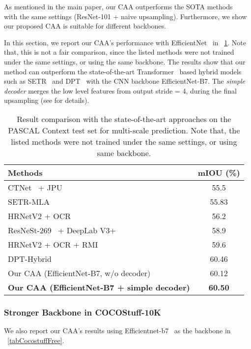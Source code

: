 \documentclass[letterpaper]{article} \usepackage{aaai22}  \usepackage{times}  \usepackage{helvet}  \usepackage{courier}  \usepackage[hyphens]{url}  \usepackage{graphicx} \urlstyle{rm} \def\UrlFont{\rm}  \usepackage{natbib}  \usepackage{caption} \DeclareCaptionStyle{ruled}{labelfont=normalfont,labelsep=colon,strut=off} \frenchspacing  \setlength{\pdfpagewidth}{8.5in}  \setlength{\pdfpageheight}{11in}  \usepackage{algorithm}
\begin{document}
As mentioned in the main paper, our CAA outperforms the SOTA methods~\cite{cCFNet, cEMANet} with the same settings (ResNet-101 + naive upsampling). 
Furthermore, we show our proposed CAA is suitable for different backbones.

In this section, we report our CAA's performance with EfficientNet~\cite{cEfficientNet} in \tablename{~\ref{tabPascalContextFree}}. 
Note that, this is not a fair comparison, since the listed methods were not trained under the same settings, or using the same backbone. 
The results show that our method can  outperform the state-of-the-art Transformer~\cite{cViT} based hybrid models such as SETR~\cite{cSETR} and DPT~\cite{cDPT} with the CNN backbone EfficientNet-B7. 
The \textit{simple decoder} merges the low level features from output stride = 4, during the final upsampling (see \cite{cDeepLabV3Plus} for details).

\begin{table}[t]
	\centering
	\small
	\begin{tabular}{l|c}
		\toprule[1pt]
		\rule{0pt}{2ex} Methods & mIOU (\%) \\
		\midrule[0.5pt]
		\midrule[0.5pt]
		CTNet~\cite{cTNet} + JPU & 55.5 \\
		SETR-MLA~\cite{cSETR} & 55.83 \\
		HRNetV2 + OCR ~\cite{cSVCNet} & 56.2\\
		ResNeSt-269~\cite{cResnest} + DeepLab V3+ & 58.9 \\
		HRNetV2 + OCR + RMI& 59.6 \\
		DPT-Hybrid~\cite{cDPT} & 60.46 \\
		\midrule[0.5pt]
		Our CAA (EfficientNet-B7, w/o decoder) & 60.12 \\
		\textbf{Our CAA (EfficientNet-B7 + simple decoder) } & \textbf{60.50}\\
		\bottomrule[1pt]
	\end{tabular}
	\caption{Result comparison with the state-of-the-art approaches on the PASCAL Context test set for multi-scale prediction. Note that, the listed methods were not trained under the same settings, or using same backbone.}
	\label{tabPascalContextFree}
\end{table}

\subsubsection{Stronger Backbone in COCOStuff-10K}
We also report our CAA's results using Efficientnet-b7~\cite{cEfficientNet} as the backbone in \tablename{~\ref{tabCocostuffFree}}. 
\end{document}
